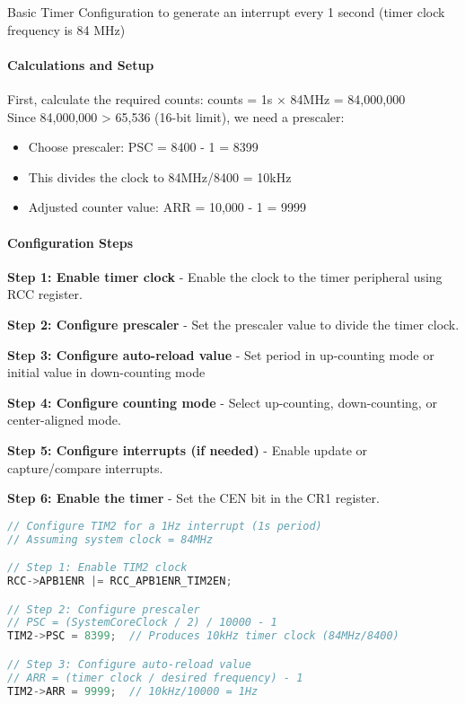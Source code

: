 \begin{example2}{Basic Timer Configuration} to generate an interrupt every 1 second (timer clock frequency is 84 MHz)
\paragraph{Calculations and Setup}
First, calculate the required counts: counts = 1s × 84MHz = 84,000,000
\vspace{1mm}\\
Since 84,000,000 > 65,536 (16-bit limit), we need a prescaler:
\begin{itemize}
    \item Choose prescaler: PSC = 8400 - 1 = 8399
    \item This divides the clock to 84MHz/8400 = 10kHz
    \item Adjusted counter value: ARR = 10,000 - 1 = 9999
\end{itemize}

\paragraph{Configuration Steps}
\textbf{Step 1: Enable timer clock} -
Enable the clock to the timer peripheral using RCC register.

\textbf{Step 2: Configure prescaler} -
Set the prescaler value to divide the timer clock.

\textbf{Step 3: Configure auto-reload value} -
Set period in up-counting mode or initial value in down-counting mode

\textbf{Step 4: Configure counting mode} -
Select up-counting, down-counting, or center-aligned mode.

\textbf{Step 5: Configure interrupts (if needed)} -
Enable update or capture/compare interrupts.

\textbf{Step 6: Enable the timer} -
Set the CEN bit in the CR1 register.

\begin{lstlisting}[language=C, style=basesmol]
// Configure TIM2 for a 1Hz interrupt (1s period)
// Assuming system clock = 84MHz

// Step 1: Enable TIM2 clock
RCC->APB1ENR |= RCC_APB1ENR_TIM2EN;

// Step 2: Configure prescaler
// PSC = (SystemCoreClock / 2) / 10000 - 1
TIM2->PSC = 8399;  // Produces 10kHz timer clock (84MHz/8400)

// Step 3: Configure auto-reload value
// ARR = (timer clock / desired frequency) - 1
TIM2->ARR = 9999;  // 10kHz/10000 = 1Hz


\end{lstlisting}
\end{example2}
